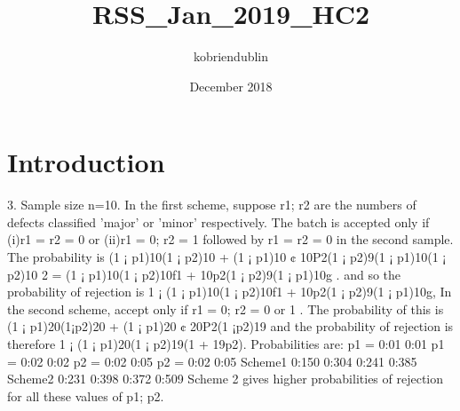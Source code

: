 \documentclass{article}
\title{RSS_Jan_2019_HC2}
\author{kobriendublin }
\date{December 2018}
\begin{document}
\maketitle

\section{Introduction}

3. Sample size n=10. In the first scheme, suppose r1; r2 are the numbers of defects classified
’major’ or ’minor’ respectively.
The batch is accepted only if (i)r1 = r2 = 0 or (ii)r1 = 0; r2 = 1 followed by r1 = r2 = 0 in the
second sample.
The probability is (1 ¡ p1)10(1 ¡ p2)10 + (1 ¡ p1)10 ¢ 10P2(1 ¡ p2)9(1 ¡ p1)10(1 ¡ p2)10
2
= (1 ¡ p1)10(1 ¡ p2)10f1 + 10p2(1 ¡ p2)9(1 ¡ p1)10g .
and so the probability of rejection is
1 ¡ (1 ¡ p1)10(1 ¡ p2)10f1 + 10p2(1 ¡ p2)9(1 ¡ p1)10g,
In the second scheme, accept only if r1 = 0; r2 = 0 or 1 .
The probability of this is (1 ¡ p1)20(1¡p2)20 + (1 ¡ p1)20 ¢ 20P2(1 ¡p2)19 and the probability of
rejection is therefore 1 ¡ (1 ¡ p1)20(1 ¡ p2)19(1 + 19p2).
Probabilities are:
p1 = 0:01 0:01 p1 = 0:02 0:02
p2 = 0:02 0:05 p2 = 0:02 0:05
Scheme1 0:150 0:304 0:241 0:385
Scheme2 0:231 0:398 0:372 0:509
Scheme 2 gives higher probabilities of rejection for all these values of p1; p2.
\end{document}
